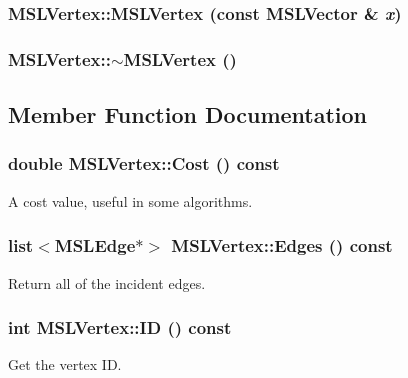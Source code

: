 \subsubsection{\setlength{\rightskip}{0pt plus 5cm}MSLVertex::MSLVertex (const {\bf MSLVector} \& {\em x})}\label{classMSLVertex_a10}


\subsubsection{\setlength{\rightskip}{0pt plus 5cm}MSLVertex::$\sim$MSLVertex ()}\label{classMSLVertex_a11}




\subsection{Member Function Documentation}
\subsubsection{\setlength{\rightskip}{0pt plus 5cm}double MSLVertex::Cost () const\hspace{0.3cm}{\tt  [inline]}}\label{classMSLVertex_a2}


A cost value, useful in some algorithms.

\subsubsection{\setlength{\rightskip}{0pt plus 5cm}list$<${\bf MSLEdge}$\ast$$>$ MSLVertex::Edges () const\hspace{0.3cm}{\tt  [inline]}}\label{classMSLVertex_a1}


Return all of the incident edges.

\subsubsection{\setlength{\rightskip}{0pt plus 5cm}int MSLVertex::ID () const\hspace{0.3cm}{\tt  [inline]}}\label{classMSLVertex_a5}


Get the vertex ID.

